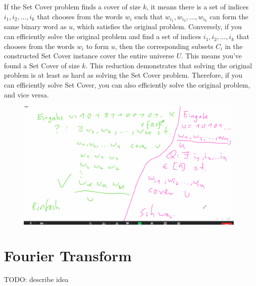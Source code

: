 If the Set Cover problem finds a cover of size $k$, it means there is a set of indices $i_1, i_2, \dots, i_k$ that chooses from the words $w_i$ such that $w_{i_1}, w_{i_2}, \dots, w_{i_k}$ can form the same binary word as $u$, which satisfies the original problem. Conversely, if you can efficiently solve the original problem and find a set of indices $i_1, i_2, \dots, i_k$ that chooses from the words $w_i$ to form $u$, then the corresponding subsets $C_i$ in the constructed Set Cover instance cover the entire universe $U$. This means you've found a Set Cover of size $k$. This reduction demonstrates that solving the original problem is at least as hard as solving the Set Cover problem. Therefore, if you can efficiently solve Set Cover, you can also efficiently solve the original problem, and vice versa.

\begin{figure}[h]
	\includegraphics[width=\linewidth]{proof-sketches/Screenshot[2]-01.png}
\end{figure}



\section{Fourier Transform}
TODO: describe idea




